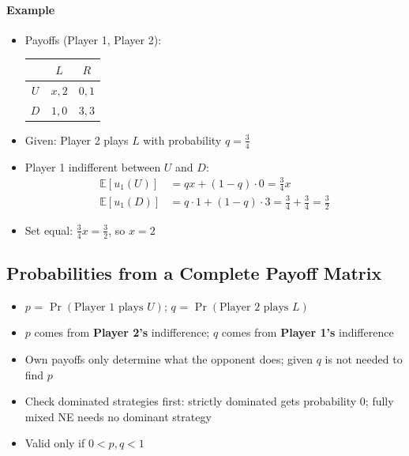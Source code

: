 \paragraph{Example}
\begin{itemize}
    \item Payoffs (Player 1, Player 2):
          \begin{center}
              \begin{tabular}{c|c|c}
                      & $L$   & $R$   \\ \hline
                  $U$ & $x,2$ & $0,1$ \\ \hline
                  $D$ & $1,0$ & $3,3$ \\
              \end{tabular}
          \end{center}
    \item Given: Player 2 plays $L$ with probability $q=\frac{3}{4}$
    \item Player 1 indifferent between $U$ and $D$:
          \begin{align*}
              \mathbb{E}[u_1(U)] & = qx + (1-q)\cdot 0 = \tfrac{3}{4}x                                  \\
              \mathbb{E}[u_1(D)] & = q\cdot 1 + (1-q)\cdot 3 = \tfrac{3}{4}+\tfrac{3}{4} = \tfrac{3}{2}
          \end{align*}
    \item Set equal: $\frac{3}{4}x = \frac{3}{2}$, so $\boxed{x=2}$
\end{itemize}

\subsection{Probabilities from a Complete Payoff Matrix}
\begin{itemize}
    \item $p$ = $\Pr(\text{Player 1 plays } U)$; $q$ = $\Pr(\text{Player 2 plays } L)$
    \item $p$ comes from \textbf{Player 2's} indifference; $q$ comes from \textbf{Player 1's} indifference
    \item Own payoffs only determine what the opponent does; given $q$ is not needed to find $p$
    \item Check dominated strategies first: strictly dominated gets probability $0$; fully mixed NE needs no dominant strategy
    \item Valid only if $0<p,q<1$
\end{itemize}

